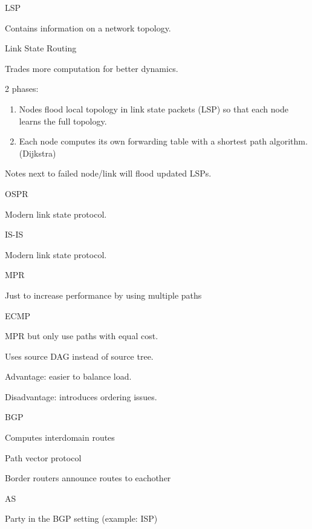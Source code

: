 \documentclass[main.tex]{subfiles}
\begin{document}
\begin{card}{LSP}
\item Contains information on a network topology.
\end{card}

\begin{card}{Link State Routing}
\item Trades more computation for better dynamics.
\item 2 phases:
    \begin{enumerate}
        \item Nodes flood local topology in link state packets (LSP) so that each node learns the full topology.
        \item Each node computes its own forwarding table with a shortest path algorithm. (Dijkstra)
    \end{enumerate}
\item Notes next to failed node/link will flood updated LSPs.
\end{card}

\begin{card}{OSPR}
\item Modern link state protocol.
\end{card}

\begin{card}{IS-IS}
\item Modern link state protocol.
\end{card}

\begin{card}{MPR}
\item Just to increase performance by using multiple paths
\end{card}

\begin{card}{ECMP}
\item MPR but only use paths with equal cost.
\item Uses source DAG instead of source tree.
\item Advantage: easier to balance load.
\item Disadvantage: introduces ordering issues.
\end{card}

\begin{card}{BGP}
\item Computes interdomain routes
\item Path vector protocol
\item Border routers announce routes to eachother
\end{card}

\begin{card}{AS}
\item Party in the BGP setting (example: ISP)
\end{card}
\end{document}
